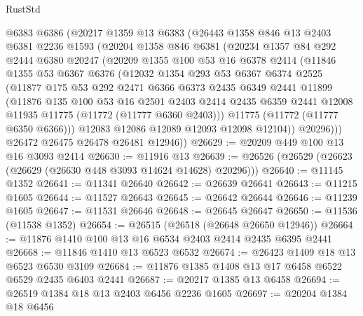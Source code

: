 \begin{lexlean}{RustStd}
\begin{coremodule}
    @6383
    @6386
    (@20217
      @1359
      @13
      @6383
      (@26443
        @1358
        @846
        @13
        @2403
        @6381
        @2236
        @1593
        (@20204
          @1358
          @846
          @6381
          (@20234
            @1357
            @84
            @292
            @2444
            @6380
            @20247
            (@20209
              @1355
              @100
              @53
              @16
              @6378
              @2414
              (@11846
                @1355
                @53
                @6367
                @6376
                (@12032
                  @1354
                  @293
                  @53
                  @6367
                  @6374
                  @2525
                  (@11877
                    @175
                    @53
                    @292
                    @2471
                    @6366
                    @6373
                    @2435
                    @6349
                    @2441
                    @11899
                    (@11876
                      @135
                      @100
                      @53
                      @16
                      @2501
                      @2403
                      @2414
                      @2435
                      @6359
                      @2441
                      @12008
                      @11935
                      @11775
                      (@11772 (@11777 @6360 @2403)))
                    @11775
                    (@11772 (@11777 @6350 @6366)))
                  @12083
                  @12086
                  @12089
                  @12093
                  @12098
                  @12104))
              @20296)))
        @26472
        @26475
        @26478
        @26481
        @12946))
@26629 := @20209 @449 @100 @13 @16 @3093 @2414
@26630 := @11916 @13
@26639 := @26526 (@26529 (@26623 (@26629 (@26630 @448 @3093 @14624 @14628) @20296)))
@26640 := @11145 @1352
@26641 := @11341 @26640
@26642 := @26639 @26641
@26643 := @11215 @1605
@26644 := @11527 @26643
@26645 := @26642 @26644
@26646 := @11239 @1605
@26647 := @11531 @26646
@26648 := @26645 @26647
@26650 := @11536 (@11538 @1352)
@26654 := @26515 (@26518 (@26648 @26650 @12946))
@26664 := @11876 @1410 @100 @13 @16 @6534 @2403 @2414 @2435 @6395 @2441
@26668 := @11846 @1410 @13 @6523 @6532
@26674 := @26423 @1409 @18 @13 @6523 @6530 @3109
@26684 := @11876 @1385 @1408 @13 @17 @6458 @6522 @6529 @2435 @6403 @2441
@26687 := @20217 @1385 @13 @6458
@26694 := @26519 @1384 @18 @13 @2403 @6456 @2236 @1605
@26697 := @20204 @1384 @18 @6456

\end{coremodule}
\end{lexlean}
